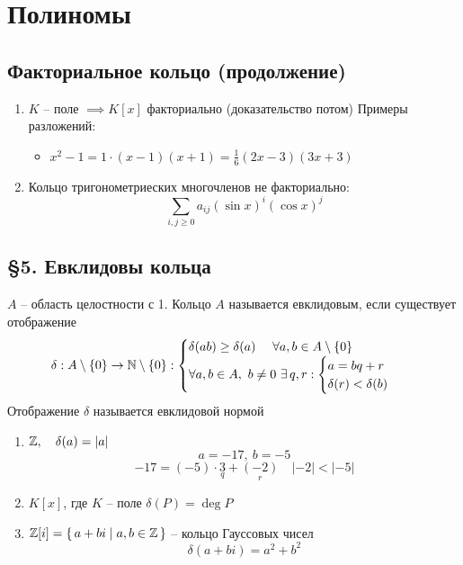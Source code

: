 \chapter{Полиномы}

\section{Факториальное кольцо (продолжение)}

\begin{egs}
    \begin{enumerate}
        \hfill
    	\item $K$ -- поле $ \implies K[x] $ факториально (доказательство потом)
        Примеры разложений:
        \begin{itemize}
        	\item $ x^2 - 1 = 1 \cdot (x-1)(x+1) = \frac16 (2x-3)(3x+3) $
        \end{itemize}
        \item Кольцо тригонометриеских многочленов не факториально:
        $$ \sum_{i,j \ge 0} a_{ij} (\sin x)^i (\cos x)^j $$
    \end{enumerate}

\end{egs}

\section{\S 5. Евклидовы кольца}
\begin{definition}
    $A$ -- область целостности с 1. Кольцо $A$ называется евклидовым, если существует отображение $$ \delta : A \setminus \{0\} \to \mathbb{N} \setminus \{0\} : \begin{cases} \delta (ab) \ge \delta(a) ~ \quad \forall a,b \in A \setminus \{0\} \\ \forall a,b \in A, ~ b \ne 0 ~ \exists\, q,r : \begin{cases} a = bq + r \\ \delta(r) < \delta(b) \end{cases} \end{cases} $$ Отображение $ \delta$ называется евклидовой нормой
\end{definition}

\begin{eg}
    \begin{enumerate}
    	\item $ \mathbb{Z}, \quad \delta(a) = |a| $
        $$ a = -17, ~ b = -5 $$
        $$ -17 = (-5) \cdot \underset{q}3 + \underset{r}{(-2)} \quad |-2| < |-5| $$
        \item $ K[x] $, где $K$ -- поле \quad $\delta(P) = \deg P $
        \item $ \mathbb{Z}[i] = \set{a + bi \mid a, b \in \ensuremath{\mathbb{Z}}} $ -- кольцо Гауссовых чисел
        $$ \delta(a + bi) = a^2 + b^2 $$
    \end{enumerate}

\end{eg}

